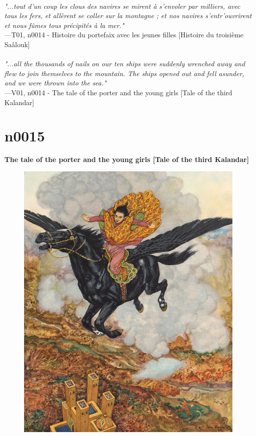 \documentclass[../Carre_nights.tex]{subfiles}
\begin{document}
\textit{\\
"...tout d’un coup les clous des navires se mirent à s’envoler par milliers, avec tous les fers, et allèrent se coller sur la montagne ; et nos navires s’entr’ouvrirent et nous fûmes tous précipités à la mer."} \\
—T01, n0014 - Histoire du portefaix avec les jeunes filles [Histoire du troisième Saâlouk] \\~\\
\textit{"...all the thousands of nails on our ten ships were suddenly wrenched away and flew to join themselves to the mountain. The ships opened out and fell asunder, and we were thrown into the sea."} \\
—V01, n0014 - The tale of the porter and the young girls [Tale of the third Kalandar]

\newpage

\section{n0015}
\textbf{\Large{The tale of the porter and the young girls [Tale of the third Kalandar]}} \\

\begin{figure}[ht]
\centering
\includegraphics[height=\figsize]{illustrations/volume_1/T01, n0015 - Histoire du portefaix avec les jeunes filles [Histoire du troisième Saâlouk].jpg}
\end{figure}
\end{document}
